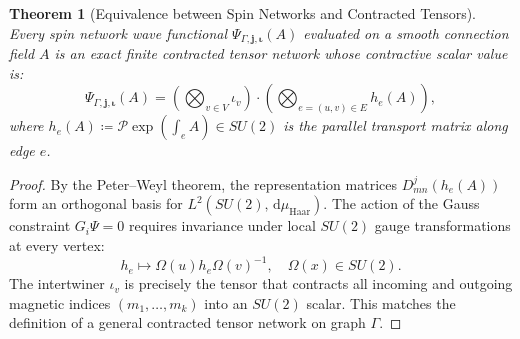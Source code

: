 \documentclass[11pt,a4paper,reqno]{amsart}
\newtheorem{theorem}{Theorem}[section]
\theoremstyle{definition}
\numberwithin{equation}{section}
\newcommand{\dif}{\,\mathrm{d}}
\begin{document}
\begin{theorem}[Equivalence between Spin Networks and Contracted Tensors]
\label{thm:spin_net_tensor_equiv}
Every spin network wave functional $\Psi_{\Gamma, \mathbf{j}, \mathbf{\iota}}(A)$ evaluated on a smooth connection field $A$ is an exact finite contracted tensor network whose contractive scalar value is:
\begin{equation}
    \label{eq:spin_net_contraction}
    \Psi_{\Gamma, \mathbf{j}, \mathbf{\iota}}(A) = \left( \bigotimes_{v \in V} \iota_v \right) \cdot \left( \bigotimes_{e = (u, v) \in E} h_e(A) \right),
\end{equation}
where $h_e(A) \coloneqq \mathcal{P} \exp\left( \int_e A \right) \in SU(2)$ is the parallel transport matrix along edge $e$.
\end{theorem}
\begin{proof}
By the Peter--Weyl theorem, the representation matrices $D_{m n}^j(h_e(A))$ form an orthogonal basis for $L^2(SU(2), \dif\mu_{\mathrm{Haar}})$. The action of the Gauss constraint $G_i \Psi = 0$ requires invariance under local $SU(2)$ gauge transformations at every vertex:
\begin{equation}
    h_e \mapsto \Omega(u) h_e \Omega(v)^{-1}, \quad \Omega(x) \in SU(2).
\end{equation}
The intertwiner $\iota_v$ is precisely the tensor that contracts all incoming and outgoing magnetic indices $(m_1, \dots, m_k)$ into an $SU(2)$ scalar. This matches the definition of a general contracted tensor network on graph $\Gamma$.
\end{proof}
\end{document}
